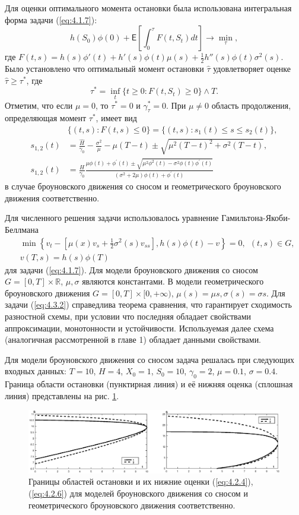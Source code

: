 \documentclass[twoside,12pt]{article}
\begin{document}
Для оценки оптимального момента остановки была использована интегральная форма задачи (\ref{eq:4.1.7}):
$$ h(S_0)\phi(0)+\mathsf E\left [\int_0^\tau F(t,S_t)dt \right ] \to \min_{\tau}, $$
где $F(t,s)=h(s)\phi'(t)+ h'(s)\phi(t)\mu(s)+\frac{1}{2}h''(s)\phi(t)\sigma^2(s).$ Было установлено что оптимальный момент остановки $\hat \tau$ удовлетворяет оценке $\hat \tau \ge \tau^*$, где
$$\tau^*=\inf_t\{t\ge 0: F(t,S_t) \ge 0\} \wedge T.$$ Отметим, что если $\mu=0$, то $\tau^*=0$ и $\gamma^*_\tau=0$. При $\mu \neq 0$ область продолжения, определяющая момент $\tau^*$, имеет вид
\begin{align}
&\{(t,s): F(t,s) \le 0\}=\{(t,s): s_1(t) \le s \le s_2(t)\},\nonumber \\
s_{1,2}(t)&=\frac{\widehat H}{\gamma_0}-\frac{\sigma^2}{\mu}-\mu(T-t) \pm \sqrt{\mu^2(T-t)^2+\sigma^2(T-t)}, \label{eq:4.2.4} \\
s_{1,2}(t)&=\frac{H}{\gamma_0}\frac{\mu\phi(t)+\phi^\prime(t)\pm \sqrt{\mu^2\phi^2(t)-\sigma^2\phi(t)\phi^\prime(t)}}{(\sigma^2+2\mu)\phi(t)+\phi^\prime(t)} \label{eq:4.2.6}
\end{align}
в случае броуновского движения со сносом и геометрического броуновского движения соответственно.

Для численного решения задачи использовалось уравнение Гамильтона-Якоби-Беллмана
\begin{align}
&\min{\left\{v_t - [\mu(x)v_{s}+\frac{1}{2}\sigma^2(s) v_{ss}],h(s)\phi(t)-v\right\}}=0,\ \  (t,s)\in G, \label{eq:4.3.2} \\
&v(T,s)=h(s)\phi(T) \nonumber
\end{align}
для задачи (\ref {eq:4.1.7}).
Для модели броуновского движения со сносом $G=[0,T] \times\mathbb R$, $\mu, \sigma$ являются константами.
В модели геометрического броуновского движения $G=[0,T] \times [0,+\infty)$, $\mu(s)=\mu s, \sigma(s)=\sigma s$.
Для задачи (\ref{eq:4.3.2}) справедлива теорема сравнения, что гарантирует сходимость разностной схемы, при условии что последняя обладает свойствами аппроксимации, монотонности и устойчивости. Используемая далее схема (аналогичная рассмотренной в главе 1) обладает данными свойствами.

Для модели броуновского движения со сносом задача решалась при следующих входных данных: $T=10$, $H=4$, $X_0=1$, $S_0=10$, $\gamma_0=2$, $\mu=0.1$, $\sigma=0.4$. Граница области остановки (пунктирная линия) и её нижняя оценка (сплошная линия) представлены на рис. \ref{fig:4}.
\begin{figure}[h!]
        \centering
          \includegraphics[width=1\textwidth]{images/common_graff}
         \caption{Границы областей остановки и их нижние оценки (\ref{eq:4.2.4}), (\ref{eq:4.2.6})  для моделей броуновского движения со сносом и геометрического броуновского движения соответственно.}
          \label{fig:4}
\end{figure}
\end{document}
